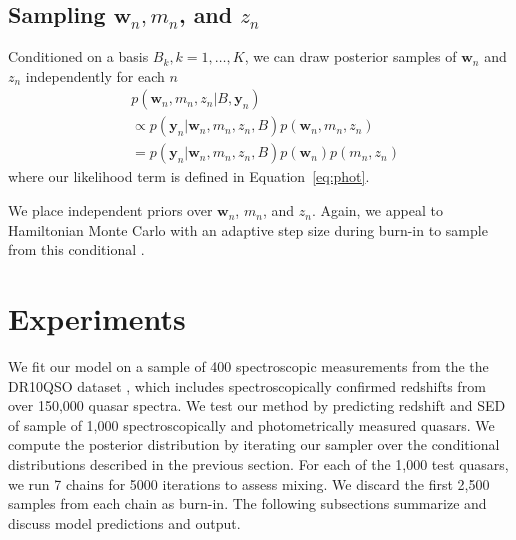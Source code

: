 \documentclass{article}
\begin{document}
\subsection{Sampling $\mathbf{w}_n, m_n$, and $z_n$}
Conditioned on a basis $B_k, k=1,\dots, K$, we can draw posterior samples of $\mathbf{w}_n$ and $z_n$ independently for each $n$
\begin{align}
  &p(\mathbf{w}_n, m_n, z_n | B, \mathbf{y}_n) \\
  &\propto p(\mathbf{y}_n | \mathbf{w}_n, m_n, z_n, B) p(\mathbf{w}_n, m_n, z_n) \\
  &= p(\mathbf{y}_n | \mathbf{w}_n, m_n, z_n, B) p(\mathbf{w}_n) p(m_n, z_n)
\end{align}
where our likelihood term is defined in Equation~\ref{eq:phot}. 

We place independent priors over $\mathbf{w}_n$, $m_n$, and $z_n$.  Again, we appeal to Hamiltonian Monte Carlo with an adaptive step size during burn-in to sample from this conditional \cite{neal2011mcmc}. 

\section{Experiments}
\label{sec:experiments}
We fit our model on a sample of 400 spectroscopic measurements from the the DR10QSO dataset \cite{paris2014sloan}, which includes spectroscopically confirmed redshifts from over 150,000 quasar spectra.  
We test our method by predicting redshift and SED of sample of 1,000 spectroscopically and photometrically measured quasars.  
We compute the posterior distribution by iterating our sampler over the conditional distributions described in the previous section.  For each of the 1,000 test quasars, we run 7 chains for 5000 iterations to assess mixing.  We discard the first 2,500 samples from each chain as burn-in.  The following subsections summarize and discuss model predictions and output.  
\end{document}
